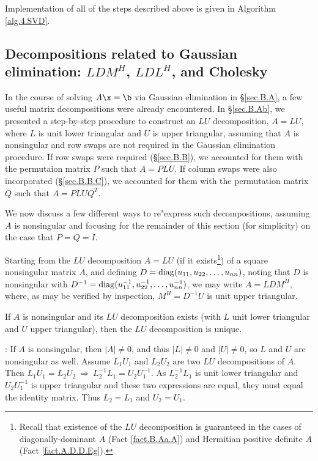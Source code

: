 Implementation of all of the steps described above is given in Algorithm \ref{alg.4.SVD}.

\clearpage
\subsection{Decompositions related to Gaussian elimination: $LDM^{H}$, $LDL^{H}$, and Cholesky}\label{sec.A.D.I}

In the course of solving $A\x=\b$ via Gaussian elimination
in \S \ref{sec.B.A}, a few useful matrix decompositions were already
encountered.  In \S \ref{sec.B.Ab}, we presented a step-by-step
procedure to construct an $LU$ decomposition, $A=LU$, where $L$ is
unit lower triangular and $U$ is upper triangular, assuming that $A$
is nonsingular and row swaps are not required in the Gaussian
elimination procedure.  If row swaps were required (\S \ref{sec.B.B}),
we accounted for them with the permutaion matrix $P$ such that
$A=PLU$.  If column swaps were also incorporated (\S \ref{sec.B.B.C}),
we accounted for them with the permutation matrix $Q$ such that
$A=PLU\!Q^{T}$.

We now discuss a few different ways to re"express such
decompositions, assuming $A$ is nonsingular and focusing for the
remainder of this section (for simplicity) on the case that $P=Q=I$.

Starting from the $LU$ decomposition $A=LU$ (if it
exists\footnote{Recall that existence of the $LU$ decomposition is
guaranteed in the cases of diagonally-dominant $A$ (Fact \ref{fact.B.Aa.A})
and Hermitian positive definite $A$ (Fact \ref{fact.A.D.D.Eg}).}) of a square nonsingular matrix $A$, and
defining $D={\rm diag}(u_{11},u_{22},\ldots,u_{nn})$, noting that $D$
is nonsingular with $D^{-1}={\rm
diag}(u^{-1}_{11},u^{-1}_{22},\ldots,u^{-1}_{nn})$, we may write
$A=LDM^{H}$, where, as may be verified by inspection, $M^{H}=D^{-1}U$
is unit upper triangular.

\begin{fact} \label{fact.B.Aa.Az}
If $A$ is nonsingular and its $LU$ decomposition exists (with $L$ unit lower triangular
and $U$ upper triangular), then the $LU$ decomposition is unique.
\end{fact}

\/: If $A$ is nonsingular, then $|A|\ne 0$, and thus $|L|\ne 0$ and $|U|\ne 0$, so
$L$ and $U$ are nonsingular as well.  Assume $L_{1}U_{1}$ and $L_{2}U_{2}$ are two
$LU$ decompositions of $A$.  Then $L_{1}U_{1}=L_{2}U_{2}\ \Rightarrow\
L_{2}^{-1}L_{1}=U_{2}U_{1}^{-1}$.  As $L_{2}^{-1}L_{1}$ is unit lower
triangular and $U_{2}U_{1}^{-1}$ is upper triangular and these two
expressions are equal, they must equal the identity matrix.  Thus
$L_{2}=L_{1}$ and $U_{2}=U_{1}$.   \endproof \vskip0.1in

